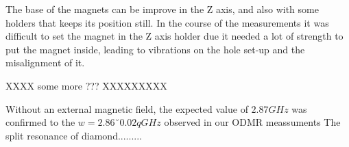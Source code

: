 The base of the magnets can be improve in the  Z axis, and also with some holders that keeps its position still. In the course of the measurements it was difficult to set the magnet in the Z axis holder due it  needed a lot of strength to put the magnet inside, leading to vibrations on the hole set-up and the misalignment of it.
 
 
XXXX some more ??? XXXXXXXXX

Without an external magnetic ﬁeld, the expected value of $2.87GHz$ was confirmed to the  $w=2.86˘0.02qGHz$ observed in our ODMR meassuments
The split resonance of diamond.........
